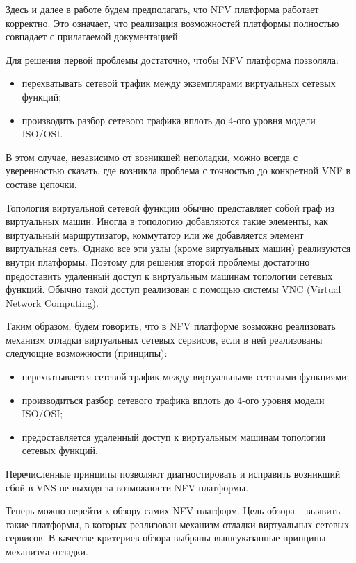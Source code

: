 \documentclass[oneside,final,14pt,a4paper]{extreport}
\begin{document}
Здесь и далее в работе будем предполагать, что NFV платформа работает корректно. Это означает, что реализация возможностей платформы полностью совпадает с прилагаемой документацией.

Для решения первой проблемы достаточно, чтобы NFV платформа позволяла:
\begin{itemize}
    \item перехватывать сетевой трафик между экземплярами виртуальных сетевых функций;
    \item производить разбор сетевого трафика вплоть до 4-ого уровня модели ISO/OSI.
\end{itemize}

В этом случае, независимо от возникшей неполадки, можно всегда с уверенностью сказать, где возникла проблема с точностью до конкретной VNF в составе цепочки.

Топология виртуальной сетевой функции обычно представляет собой граф из виртуальных машин. Иногда в топологию добавляются такие элементы, как виртуальный маршрутизатор, коммутатор или же добавляется элемент виртуальная сеть. Однако все эти узлы (кроме виртуальных машин) реализуются внутри платформы. Поэтому для решения второй проблемы достаточно предоставить удаленный доступ к виртуальным машинам топологии сетевых функций. Обычно такой доступ реализован с помощью системы VNC (Virtual Network Computing\cite{bib:vnc}).

Таким образом, будем говорить, что в NFV платформе возможно реализовать механизм отладки виртуальных сетевых сервисов, если в ней реализованы следующие возможности (принципы):
\begin{itemize}
    \item перехватывается сетевой трафик между виртуальными сетевыми функциями;
    \item производиться разбор сетевого трафика вплоть до 4-ого уровня модели ISO/OSI;
    \item предоставляется удаленный доступ к виртуальным машинам топологии сетевых функций.
\end{itemize}

Перечисленные принципы позволяют диагностировать и исправить возникший сбой в VNS не выходя за возможности NFV платформы.

Теперь можно перейти к обзору самих NFV платформ. Цель обзора -- выявить такие платформы, в которых реализован механизм отладки виртуальных сетевых сервисов. В качестве критериев обзора выбраны вышеуказанные принципы механизма отладки.
\end{document}
